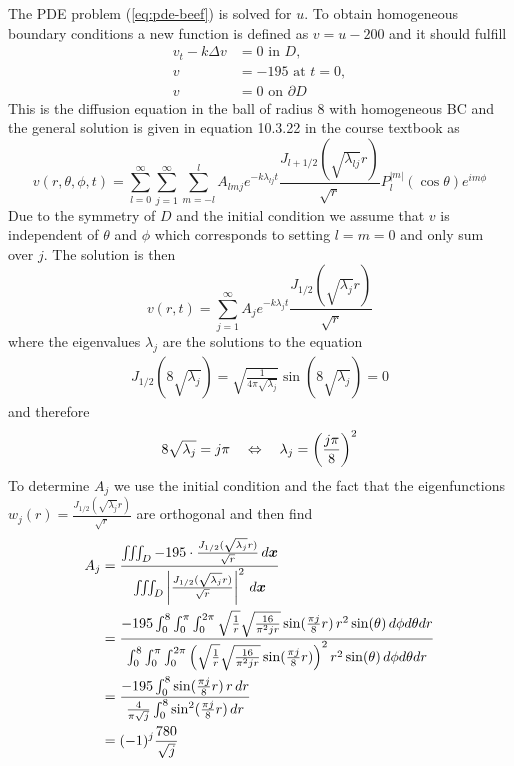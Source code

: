     The PDE problem (\ref{eq:pde-beef}) is solved for $u$. To obtain homogeneous boundary conditions a new function is defined as $v=u-200$ and it should fulfill
    \begin{align*}
        v_t - k\Delta v &= 0 \text{ in } D,\\
        v &= -195 \text{ at } t=0, \\
        v &= 0 \text{ on } \partial D 
    \end{align*}
    This is the diffusion equation in the ball of radius 8 with homogeneous BC and the general solution is given in equation 10.3.22 in the course textbook as
    \begin{equation*}
        v(r,\theta,\phi,t) = \sum_{l=0}^\infty\sum_{j=1}^\infty\sum_{m=-l}^{l} A_{lmj} e^{-k\lambda_{lj}t}\frac{J_{l+1/2}(\sqrt{\lambda_{lj}}r)}{\sqrt{r}}P_l^{|m|}(\cos\theta)e^{im\phi}
    \end{equation*}
    Due to the symmetry of $D$ and the initial condition we assume that $v$ is independent of $\theta$ and $\phi$ which corresponds to setting $l=m=0$ and only sum over $j$. The solution is then
    \begin{equation*}
        v(r,t) = \sum_{j=1}^\infty A_{j} e^{-k\lambda_{j}t}\frac{J_{1/2}(\sqrt{\lambda_{j}}r)}{\sqrt{r}}
    \end{equation*}
    where the eigenvalues $\lambda_j$ are the solutions to the equation
    \begin{align*}
        J_{1/2}(8\sqrt{\lambda_j}) = \sqrt{\frac{1}{4\pi\sqrt{\lambda_j}}}\sin(8\sqrt{\lambda_j}) = 0
    \end{align*}
    and therefore
    \begin{align*}
        8\sqrt{\lambda_j} = j\pi \quad\Leftrightarrow\quad \lambda_j = \left(\frac{j\pi}{8}\right)^2
    \end{align*}
    To determine $A_j$ we use the initial condition and the fact that the eigenfunctions $w_j(r) = \frac{J_{1/2}(\sqrt{\lambda_j}r)}{\sqrt{r}}$ are orthogonal and then find
    \begin{align*}
        A_j &= \frac{\iiint_D -195\cdot\frac{J_{1/2}(\sqrt{\lambda_j}r)}{\sqrt{r}}\,d\boldsymbol{x}}{\iiint_D \left|\frac{J_{1/2}(\sqrt{\lambda_j}r)}{\sqrt{r}}\right|^2\,d\boldsymbol{x}} \\
        &= \frac{-195\int_0^8\int_0^\pi\int_0^{2\pi} \sqrt{\frac{1}{r}}\sqrt{\frac{16}{\pi^2jr}}\sin(\frac{\pi j}{8}r)\,r^2\sin(\theta)\,d\phi d\theta dr}{\int_0^8\int_0^\pi\int_0^{2\pi} \left(\sqrt{\frac{1}{r}}\sqrt{\frac{16}{\pi^2jr}}\sin(\frac{\pi j}{8}r)\right)^2r^2\sin(\theta)\,d\phi d\theta dr} \\
        &= \frac{-195\int_0^8\sin(\frac{\pi j}{8}r)\,r\,dr}{\frac{4}{\pi\sqrt{j}}\int_0^8\sin^2(\frac{\pi j}{8}r)\,dr} \\
        &= (-1)^j\frac{780}{\sqrt{j}}
    \end{align*}
